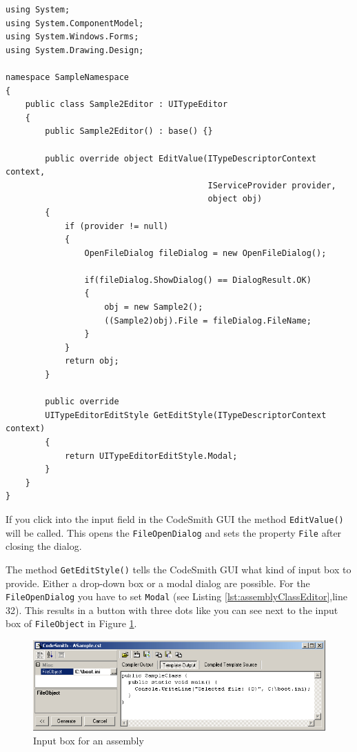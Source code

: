 \begin{lstlisting}[caption=Editor,label=lst:assemblyClassEditor]
using System;
using System.ComponentModel;
using System.Windows.Forms;
using System.Drawing.Design;

namespace SampleNamespace
{
	public class Sample2Editor : UITypeEditor
	{
		public Sample2Editor() : base() {}

		public override object EditValue(ITypeDescriptorContext context,
		                                 IServiceProvider provider,
		                                 object obj) 
		{
			if (provider != null)
			{
				OpenFileDialog fileDialog = new OpenFileDialog();

				if(fileDialog.ShowDialog() == DialogResult.OK)
				{
					obj = new Sample2();
					((Sample2)obj).File = fileDialog.FileName;
				}
			}
			return obj;
		}

		public override
		UITypeEditorEditStyle GetEditStyle(ITypeDescriptorContext context) 
		{
			return UITypeEditorEditStyle.Modal;
		}
	}
}
\end{lstlisting}

If you click into the input field in the CodeSmith GUI the method 
\verb~EditValue()~ will be called. This opens the \verb~FileOpenDialog~ 
and sets the property \verb~File~ after closing the dialog.

The method \verb~GetEditStyle()~ tells the CodeSmith GUI what kind of input 
box to provide. Either a drop-down box or a modal dialog are possible. For 
the \verb~FileOpenDialog~ you have to set \verb~Modal~ (see Listing 
\ref{lst:assemblyClassEditor},line 32). This results in a button with three 
dots like you can see next to the input box of \verb~FileObject~ in Figure 
\ref{fig:codesmithGUI2}.

\begin{figure}[thb]
	\begin{center}
		\includegraphics[width=12cm]{./files/inc/figures/codesmithGUI2}
		\caption{\label{fig:codesmithGUI2}Input box for an assembly}
	\end{center}
\end{figure}


